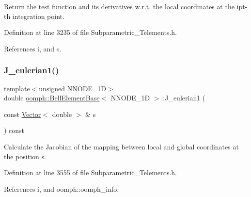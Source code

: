 Return the test function and its derivatives w.\+r.\+t. the local coordinates at the ipt-\/th integration point. 



Definition at line 3235 of file Subparametric\+\_\+\+Telements.\+h.



References i, and s.

\mbox{\label{classoomph_1_1BellElementBase_ae19c2d108290a6d46d6453ea324820f6}} 
\subsubsection{\texorpdfstring{J\+\_\+eulerian1()}{J\_eulerian1()}}
{\footnotesize\ttfamily template$<$unsigned N\+N\+O\+D\+E\+\_\+1D$>$ \\
double \hyperlink{classoomph_1_1BellElementBase}{oomph\+::\+Bell\+Element\+Base}$<$ N\+N\+O\+D\+E\+\_\+1D $>$\+::J\+\_\+eulerian1 (\begin{DoxyParamCaption}\item[{const \hyperlink{classoomph_1_1Vector}{Vector}$<$ double $>$ \&}]{s }\end{DoxyParamCaption}) const\hspace{0.3cm}{\ttfamily [inline]}}



Calculate the Jacobian of the mapping between local and global coordinates at the position s. 



Definition at line 3555 of file Subparametric\+\_\+\+Telements.\+h.



References i, and oomph\+::oomph\+\_\+info.

\mbox{\label{classoomph_1_1BellElementBase_a17c3c26035cb8f8696073b97dabbe392}} 
